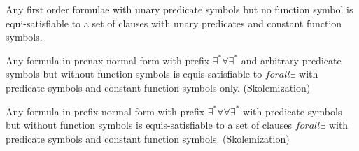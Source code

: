 \begin{lemma}
	Any first order formulae with unary predicate symbols but no function symbol 
	is equi-satisfiable to a set of clauses with unary predicates and constant function symbols.
\end{lemma}

\begin{lemma}
	 Any formula in prenax normal form with prefix $\exists^* \forall \exists^*$ 
	 and arbitrary predicate symbols but without function symbols is equis-satisfiable to 
	 $forall \exists$ with predicate symbols and constant function symbols only. (Skolemization)
\end{lemma}


\begin{lemma}
	Any formula in prefix normal form with prefix $\exists^* \forall\forall \exists^*$ 
	with predicate symbols but without function symbols 
	is equis-satisfiable to a set of clauses 
	$forall \exists$ with predicate symbols and constant function symbols. (Skolemization)
\end{lemma}

